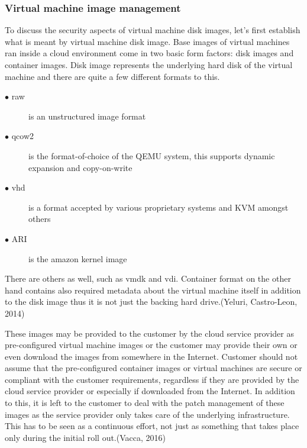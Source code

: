 \documentclass{article}
\begin{document}
\subsubsection{Virtual machine image management}
To discuss the security aspects of virtual machine disk images, let's first establish what is meant by virtual machine disk image.
Base images of virtual machines ran inside a cloud environment come in two basic form factors: disk images and container images. Disk image represents the underlying hard disk of the virtual machine and there are quite a few different formats to this.
\begin{description}
	\item[$\bullet$ raw] is an unstructured image format
	\item[$\bullet$ qcow2] is the format-of-choice of the QEMU system, this supports dynamic expansion and copy-on-write
	\item[$\bullet$ vhd] is a format accepted by various proprietary systems and KVM amongst others
	\item[$\bullet$ ARI] is the amazon kernel image
\end{description}
There are others as well, such as vmdk and vdi. Container format on the other hand contains also required metadata about the virtual machine itself in addition to the disk image thus it is not just the backing hard drive.(Yeluri, Castro-Leon, 2014)
\par
These images may be provided to the customer by the cloud service provider as pre-configured virtual machine images or the customer may provide their own or even download the images from somewhere in the Internet. Customer should not assume that the pre-configured container images or virtual machines are secure or compliant with the customer requirements, regardless if they are provided by the cloud service provider or especially if downloaded from the Internet. In addition to this, it is left to the customer to deal with the patch management of these images as the service provider only takes care of the underlying infrastructure. This has to be seen as a continuous effort, not just as something that takes place only during the initial roll out.(Vacca, 2016)
\end{document}
